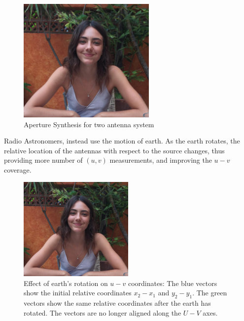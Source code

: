 \begin{figure}[h]
	\centering \vspace{-0.1in}
	\includegraphics[width=0.6\textwidth]{images/aperture_synth.png}	
	\vspace{-20pt} \caption[Aperture Synthesis for two antenna system]{\small Aperture Synthesis for two antenna system \footnotemark}
	\label{fig:aperture_synth}
\end{figure}
Radio Astronomers, instead use the motion of earth. As the earth rotates, the relative location of the antennas with respect to the source 
changes, thus providing more number of $(u,v)$ measurements, and improving the $u-v$ coverage. 
\begin{figure}[!b]
	\centering \vspace{-0.1in}
	\includegraphics[width=0.5\textwidth]{images/aperture_synth.png}	
	\caption[Effect of earth's rotation on $u-v$ coordinates]{\small Effect of earth's rotation on $u-v$ coordinates: The blue vectors show the initial relative coordinates $x_2 - x_1$ and $y_2 - y_1$. The green vectors show the same relative coordinates after the earth has rotated. The vectors are no longer aligned along the $U-V$ axes.}
	\label{fig:apsynth2}
\end{figure}


